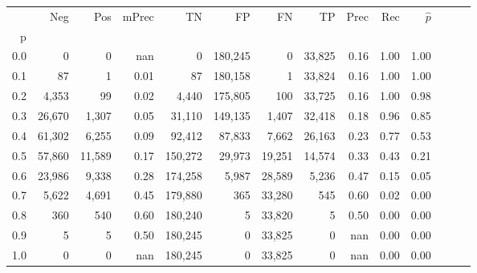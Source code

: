 \begin{tabular}{rrrrrrrrrrrrrr}
\toprule
{} &     Neg &     Pos & mPrec &       TN &       FP &      FN &      TP &  Prec &   Rec & $\hat{p}$ \\
p   &         &         &       &          &          &         &         &       &       &           \\
\midrule
0.0 &       0 &       0 &   nan &        0 &  180,245 &       0 &  33,825 &  0.16 &  1.00 &      1.00 \\
0.1 &      87 &       1 &  0.01 &       87 &  180,158 &       1 &  33,824 &  0.16 &  1.00 &      1.00 \\
0.2 &   4,353 &      99 &  0.02 &    4,440 &  175,805 &     100 &  33,725 &  0.16 &  1.00 &      0.98 \\
0.3 &  26,670 &   1,307 &  0.05 &   31,110 &  149,135 &   1,407 &  32,418 &  0.18 &  0.96 &      0.85 \\
0.4 &  61,302 &   6,255 &  0.09 &   92,412 &   87,833 &   7,662 &  26,163 &  0.23 &  0.77 &      0.53 \\
0.5 &  57,860 &  11,589 &  0.17 &  150,272 &   29,973 &  19,251 &  14,574 &  0.33 &  0.43 &      0.21 \\
0.6 &  23,986 &   9,338 &  0.28 &  174,258 &    5,987 &  28,589 &   5,236 &  0.47 &  0.15 &      0.05 \\
0.7 &   5,622 &   4,691 &  0.45 &  179,880 &      365 &  33,280 &     545 &  0.60 &  0.02 &      0.00 \\
0.8 &     360 &     540 &  0.60 &  180,240 &        5 &  33,820 &       5 &  0.50 &  0.00 &      0.00 \\
0.9 &       5 &       5 &  0.50 &  180,245 &        0 &  33,825 &       0 &   nan &  0.00 &      0.00 \\
1.0 &       0 &       0 &   nan &  180,245 &        0 &  33,825 &       0 &   nan &  0.00 &      0.00 \\
\bottomrule
\end{tabular}
